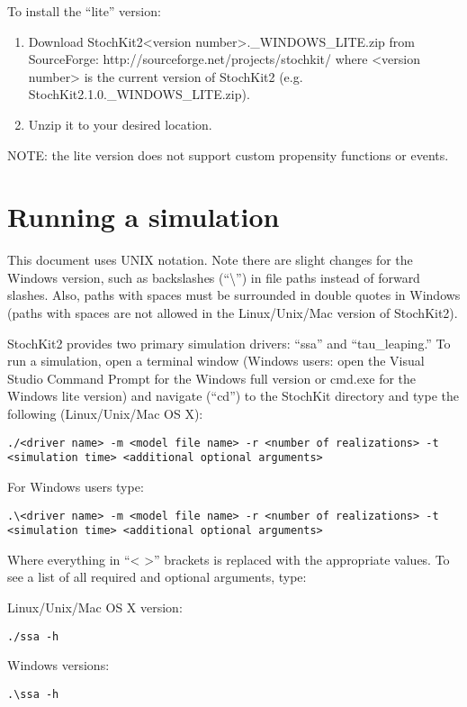 \documentclass[11pt,letterpaper]{article}
\begin{document}
To install the ``lite'' version:
\begin{enumerate}
    \item Download StochKit2<version number>.\_WINDOWS\_LITE.zip from SourceForge: http://sourceforge.net/projects/stochkit/ where <version number> is the current version of StochKit2 (e.g. StochKit2.1.0.\_WINDOWS\_LITE.zip).
    \item Unzip it to your desired location.
\end{enumerate}
NOTE: the lite version does not support custom propensity functions or events.



\section{Running a simulation}

This document uses UNIX notation.  Note there are slight changes for the Windows version, such as backslashes (``\textbackslash'') in file paths instead of forward slashes.  Also, paths with spaces must be surrounded in double quotes in Windows (paths with spaces are not allowed in the Linux/Unix/Mac version of StochKit2).

StochKit2 provides two primary simulation drivers: ``ssa'' and ``tau\_leaping.''
To run a simulation, open a terminal window (Windows users: open the Visual Studio Command Prompt for the Windows full version or cmd.exe for the Windows lite version) and navigate (``cd'') to the StochKit directory and type the following (Linux/Unix/Mac OS X):
\begin{lstlisting}
./<driver name> -m <model file name> -r <number of realizations> -t
<simulation time> <additional optional arguments>
\end{lstlisting}

For Windows users type:
\begin{lstlisting}
.\<driver name> -m <model file name> -r <number of realizations> -t
<simulation time> <additional optional arguments>
\end{lstlisting}

Where everything in ``< >'' brackets is replaced with the appropriate values.  To see a list of all required and optional arguments, type:

Linux/Unix/Mac OS X version:
\begin{lstlisting}
./ssa -h
\end{lstlisting}
Windows versions:
\begin{lstlisting}
.\ssa -h 
\end{lstlisting}
\end{document}
